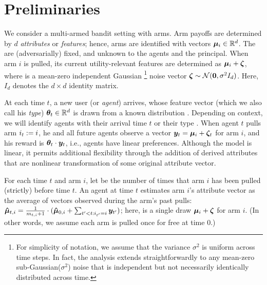 \section{Preliminaries}
\label{sec:prob}

We consider a multi-armed bandit setting with \ARMNUM arms.
Arm payoffs are determined by $d$ \emph{attributes} or \emph{features};
hence, arms are identified with vectors $\ArmV{i} \in \R^d$.
The  are (adversarially) fixed, and unknown to the agents
and the principal.
When arm $i$ is pulled, its current utility-relevant features are
determined as $\ArmV{i} + \NoiseV$, where \NoiseV is a mean-zero independent Gaussian%
\footnote{For simplicity of notation, we assume that the variance
  $\sigma^2$ is uniform across time steps.
In fact, the analysis extends straightforwardly to any
mean-zero sub-Gaussian($\sigma^2$) noise that is independent but not necessarily identically distributed across time.}
noise vector $\NoiseV \sim \Normal{\vc{0}}{\sigma^2 I_{d}}$.
Here, $I_d$ denotes the $d \times d$ identity matrix.

At each time $t$, a new user (or \emph{agent}) arrives,
whose feature vector (which we also call his \emph{type})
$\AgentV{t} \in \R^d$ is drawn from a known distribution \AgentDist.
Depending on context, we will identify agents with their arrival time
$t$ or their type .
When agent $t$ pulls arm $\Pull{t} := i$,
he and all future agents observe a vector
$\ObsV{t} = \ArmV{i} + \NoiseV[t]$ for arm $i$,
and his reward is $\AgentV{t} \cdot \ObsV{t}$,
i.e., agents have linear preferences.
Although the model is linear, it permits additional flexibility
through the addition of derived attributes that are nonlinear
transformation of some original attribute vector.

For each time $t$ and arm $i$, let  be the number of
times that arm $i$ has been pulled (strictly) before time $t$.
An agent at time $t$ estimates arm $i$'s attribute vector as the
average of vectors observed during the arm's past pulls:
$\ArmEV{t}{i} = \frac{1}{\NumPull{t}{i}+1} \cdot
(\ArmEV{0}{i} + \sum_{t'<t: \Pull{t'} = i} \ObsV{t'})$;
here,  is a single draw $\ArmV{i} + \NoiseV$ for arm $i$.
(In other words, we assume each arm is pulled once for free at time 0.)
  
